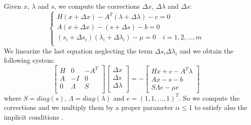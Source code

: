 \documentclass{article}
\begin{document}
Given $x$, $\lambda$ and $s$, we compute the corrections $\Delta x$, $\Delta \lambda$ and $\Delta s$:
%
\begin{equation}
\begin{cases}
H(x+\Delta x)-A^T(\lambda+\Delta \lambda)-c=0\\
A(x+\Delta x)-(s+\Delta s)-b=0\\
(s_i+\Delta s_i) (\lambda_i+\Delta \lambda_i)-\mu=0 \quad i=1,2,...,m \\
\end{cases}
\end{equation}
%
We linearize the last equation neglecting the term $\Delta s_i \Delta \lambda_i$ and we obtain the following system:
%
\begin{equation*}
\begin{bmatrix}
H & 0 & -A^T \\
A & -I & 0 \\
0 & \Lambda & S \\
\end{bmatrix} 
\begin{bmatrix}
\Delta x \\
\Delta s \\
\Delta \lambda \\
\end{bmatrix} 
 = - 
\begin{bmatrix}
H x + c - A^T \lambda \\
A x - s - b \\
S \Lambda e - \mu e
\end{bmatrix} 
\end{equation*}
%
where $S = diag(s)$, $\Lambda = diag(\lambda)$ and $e = (1, 1, ..., 1)^T$. 
So we compute the corrections and we multiply them by a proper parameter $\alpha \leq 1$ to satisfy also the implicit conditions .
\end{document}

